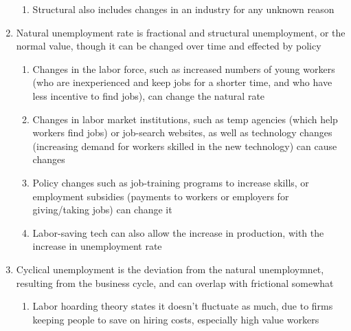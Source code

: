 \documentclass[11 pt, twoside]{article}
\begin{document}
\begin{enumerate}
\begin{enumerate}
\item Structural also includes changes in an industry for any unknown reason
\end{enumerate}
\item Natural unemployment rate is fractional and structural unemployment, or the normal value, though it can be changed over time and effected by policy
\begin{enumerate}
\item Changes in the labor force, such as increased numbers of young workers (who are inexperienced and keep jobs for a shorter time, and who have less incentive to find jobs), can change the natural rate
\item Changes in labor market institutions, such as temp agencies (which help workers find jobs) or job-search websites, as well as technology changes (increasing demand for workers skilled in the new technology) can cause changes
\item Policy changes such as job-training programs to increase skills, or employment subsidies (payments to workers or employers for giving/taking jobs) can change it
\item Labor-saving tech can also allow the increase in production, with the increase in unemployment rate
\end{enumerate}
\item Cyclical unemployment is the deviation from the natural unemploymnet, resulting from the business cycle, and can overlap with frictional somewhat
\begin{enumerate}
\item Labor hoarding theory states it doesn't fluctuate as much, due to firms keeping people to save on hiring costs, especially high value workers
\end{enumerate}
\end{enumerate}
\end{document}
